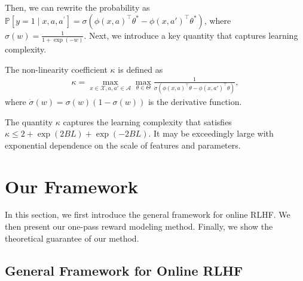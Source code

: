 Then, we can rewrite the probability as $\mathbb{P}\left[y=1 \mid x, a, a^{\prime}\right] = \sigma(\phi(x, a)^\top \theta^* - \phi(x, a')^\top \theta^* )$, where $\sigma(w) = \frac{1}{1 + \exp(-w)}$. Next, we introduce a key quantity that captures learning complexity.
\begin{myDef}
    \label{def:kappa}
    The non-linearity coefficient $\kappa$ is defined as
    \begin{align}
        \kappa = \max_{x \in \mathcal{X}, a, a' \in \mathcal{A}} \max_{\theta \in \Theta} \frac{1}{\dot{\sigma}\left(\phi(x, a)^\top \theta - \phi(x, a')^\top \theta\right)},
        \label{eq:kappa}
    \end{align}
    where $\dot{\sigma}(w) = \sigma(w)(1 - \sigma(w))$ is the derivative function.
\end{myDef}
The quantity $\kappa$ captures the learning complexity that satisfies $\kappa \leq 2 + \exp(2BL) + \exp(-2BL)$. It may be exceedingly large with exponential dependence on the scale of features and parameters.

\section{Our Framework}
\label{sec:framework}

In this section, we first introduce the general framework for online RLHF. We then present our one-pass reward modeling method. Finally, we show the theoretical guarantee of our method.


\subsection{General Framework for Online RLHF}



